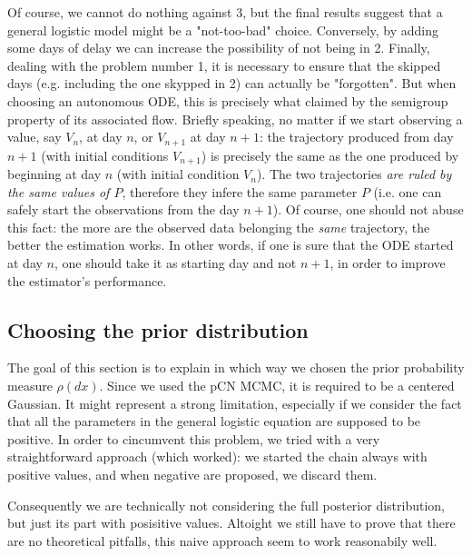 \documentclass[8pt]{article}
\begin{document}
Of course, we cannot do nothing against $3$, but the final results suggest
that a general logistic model might be a "not-too-bad" choice.
Conversely, by adding some days of delay we can increase the
possibility of not being in 2.
Finally, dealing with the problem number 1,
it is necessary to ensure that the skipped days 
(e.g. including the one skypped in 2)
can actually be "forgotten".
But when choosing an autonomous ODE, this is precisely what
claimed by the semigroup property of its associated flow.
Briefly speaking,
no matter if we start observing a value, say $V_n$, at 
day $n$, or $V_{n+1}$ at day $n+1$: 
the trajectory produced from day $n+1$ (with initial
conditions $V_{n+1}$) is precisely the same as the one
produced by beginning at day $n$ (with initial condition $V_n$).
The two trajectories \emph{are ruled by the same values of $P$},
therefore they infere the same parameter $P$ (i.e. one can safely
start the observations from the day $n+1$).
Of course, one should not abuse this fact:
the more are the observed data belonging the \emph{same}
trajectory, the better the estimation works.
In other words, if one is sure that the ODE started at day $n$,
one should take it as starting day and not $n+1$, in order to
improve the estimator's performance.


\subsection{Choosing the prior distribution}
The goal of this section is to explain in which way we chosen the
prior probability measure $\rho(dx)$.
Since we used the pCN MCMC, it is required to be a centered Gaussian. 
It might represent
a strong limitation, especially if we consider the fact
that all the parameters in the general logistic equation
are supposed to be positive. In order to cincumvent this problem,
we tried with a very straightforward approach (which worked):
we started the chain always with positive values,
and when negative are proposed, we discard them.


Consequently we are technically not considering the full posterior
distribution, but just its part with posisitive values.
Altoight we still have to prove that there are no theoretical
pitfalls, this naive approach seem to work reasonabily well.

\end{document}
